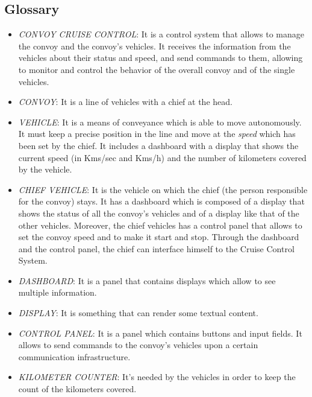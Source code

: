 \documentclass{llncs}
\begin{document}
\subsection{Glossary}
\begin{itemize}
  \item \emph{CONVOY CRUISE CONTROL}: It is a control system that allows to manage the convoy and the convoy's vehicles. It receives the information from the vehicles about their status and speed, and send commands to them, allowing to monitor and control the behavior of the overall convoy and of the single vehicles.\\

  \item \emph{CONVOY}: It is a line of vehicles with a chief at the head.\\

  \item \emph{VEHICLE}: It is a means of conveyance which is able to move autonomously. It must keep a precise position in the line and move at the \emph{speed} which has been set by the chief. It includes a dashboard with a display that shows the current speed (in Kms/sec and Kms/h) and the number of kilometers covered by the vehicle.\\

  \item \emph{CHIEF VEHICLE}: It is the vehicle on which the chief (the person responsible for the convoy) stays. It has a dashboard which is composed of a display that shows the status of all the convoy's vehicles and of a display like that of the other vehicles. Moreover, the chief vehicles has a control panel that allows to set the convoy speed and to make it start and stop. Through the dashboard and the control panel, the chief can interface himself to the Cruise Control System. \\

  \item \emph{DASHBOARD}: It is a panel that contains displays which allow to see multiple information. \\

  \item \emph{DISPLAY}: It is something that can render some textual content.\\

  \item \emph{CONTROL PANEL}: It is a panel which contains buttons and input fields. It allows to send commands to the convoy's vehicles upon a certain communication infrastructure.\\

  \item \emph{KILOMETER COUNTER}: It's needed by the vehicles in order to keep the count of the kilometers covered.\\
\end{itemize}
\end{document}
